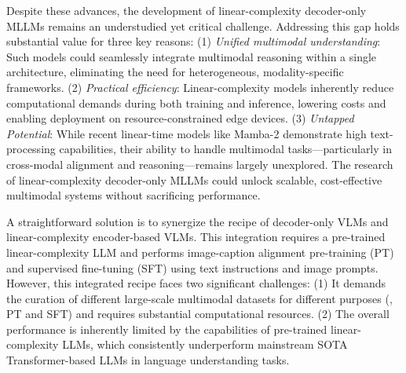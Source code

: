 Despite these advances, the development of linear-complexity decoder-only MLLMs remains an understudied yet critical challenge. Addressing this gap holds substantial value for three key reasons: (1) \textit{Unified multimodal understanding}: Such models could seamlessly integrate multimodal reasoning within a single architecture, eliminating the need for heterogeneous, modality-specific frameworks. (2) \textit{Practical efficiency}: Linear-complexity models inherently reduce computational demands during both training and inference, lowering costs and enabling deployment on resource-constrained edge devices. (3) \textit{Untapped Potential}: While recent linear-time models like Mamba-2 demonstrate high text-processing capabilities, their ability to handle multimodal tasks—particularly in cross-modal alignment and reasoning—remains largely unexplored. The research of linear-complexity decoder-only MLLMs could unlock scalable, cost-effective multimodal systems without sacrificing performance.

A straightforward solution is to synergize the recipe of decoder-only VLMs and linear-complexity encoder-based VLMs.
This integration requires a pre-trained linear-complexity LLM and performs image-caption alignment pre-training (PT) and supervised fine-tuning (SFT) using text instructions and image prompts. 
However, this integrated recipe faces two significant challenges:
(1) It demands the curation of different large-scale multimodal datasets for different purposes (\ie, PT and SFT) and requires substantial computational resources. 
(2) The overall performance is inherently limited by the capabilities of pre-trained linear-complexity LLMs, which consistently underperform mainstream SOTA Transformer-based LLMs in language understanding tasks.

